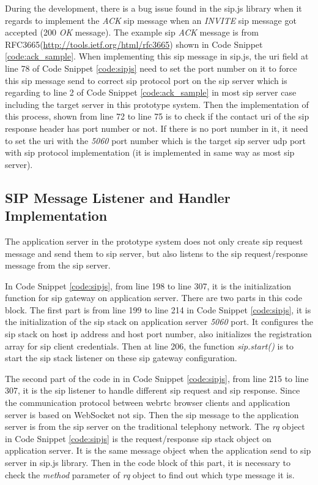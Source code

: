 \par During the development, there is a bug issue found in the sip.js library when it regards to implement the \textit{ACK} \gls{sip} message when an \textit{INVITE} \gls{sip} message got accepted (200 \textit{OK} message). The example \gls{sip} \textit{ACK} message is from RFC3665(\url{http://tools.ietf.org/html/rfc3665}) shown in Code Snippet \ref{code:ack_sample}. When implementing this \gls{sip} message in sip.js, the \gls{uri} field at line 78 of Code Snippet \ref{code:sipjs} need to set the port number on it to force this \gls{sip} message send to correct \gls{sip} protocol port on the \gls{sip} server which is regarding to line 2 of Code Snippet \ref{code:ack_sample} in most \gls{sip} server case including the target server in this prototype system. Then the implementation of this process, shown from line 72 to line 75 is to check if the contact \gls{uri} of the \gls{sip} response header has port number or not. If there is no port number in it, it need to set the \gls{uri} with the \textit{5060} port number which is the target \gls{sip} server \gls{udp} port with \gls{sip} protocol implementation (it is implemented in same way as most \gls{sip} server).

\subsection{SIP Message Listener and Handler Implementation}

\par The application server in the prototype system does not only create \gls{sip} request message and send them to \gls{sip} server, but also listens to the \gls{sip} request/response message from the \gls{sip} server.

In Code Snippet \ref{code:sipjs}, from line 198 to line 307, it is the initialization function for \gls{sip} gateway on application server. There are two parts in this code block. The first part is from line 199 to line 214 in Code Snippet \ref{code:sipjs}, it is the initialization of the \gls{sip} stack on application server \textit{5060} port. It configures the \gls{sip} stack on host \gls{ip} address and host port number, also initializes the registration array for sip client credentials. Then at line 206, the function \textit{sip.start()} is to start the \gls{sip} stack listener on these \gls{sip} gateway configuration. 

\par The second part of the code in in Code Snippet \ref{code:sipjs}, from line 215 to line 307, it is the \gls{sip} listener to handle different \gls{sip} request and \gls{sip} response. Since the communication protocol between \gls{webrtc} browser clients and application server is based on WebSocket not \gls{sip}. Then the \gls{sip} message to the application server is from the \gls{sip} server on the traditional telephony network. The \textit{rq} object in Code Snippet \ref{code:sipjs} is the request/response \gls{sip} stack object on application server. It is the same message object when the application send to \gls{sip} server in sip.js library. Then in the code block of this part, it is necessary to check the \textit{method} parameter of \textit{rq} object to find out which type message it is.

